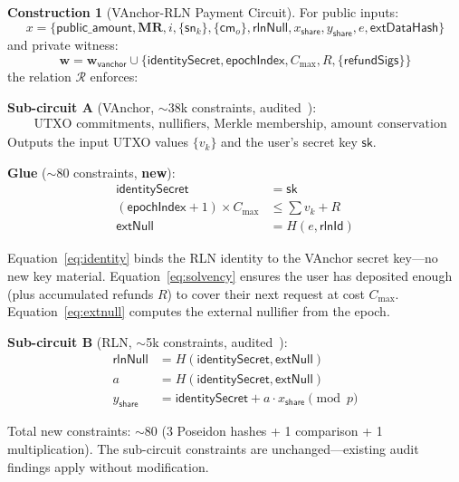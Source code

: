 \documentclass[11pt,a4paper]{article}
\theoremstyle{definition}
\newtheorem{construction}{Construction}
\begin{document}
\begin{construction}[VAnchor-RLN Payment Circuit]\label{con:composed}
For public inputs:
$$x = \{\mathsf{public\_amount}, \mathbf{MR}, i, \{\mathsf{sn}_k\}, \{\mathsf{cm}_o\}, \mathsf{rlnNull}, x_{\mathsf{share}}, y_{\mathsf{share}}, e, \mathsf{extDataHash}\}$$
and private witness:
$$\mathbf{w} = \mathbf{w}_{\mathsf{vanchor}} \cup \{\mathsf{identitySecret}, \mathsf{epochIndex}, C_{\max}, R, \{\mathsf{refundSigs}\}\}$$
the relation $\mathcal{R}$ enforces:

\medskip\noindent\textbf{Sub-circuit A} (VAnchor, $\sim$38k constraints, audited~\cite{veridise}):
\begin{align}
  &\text{UTXO commitments, nullifiers, Merkle membership, amount conservation}
\end{align}
Outputs the input UTXO values $\{v_k\}$ and the user's secret key $\mathsf{sk}$.

\medskip\noindent\textbf{Glue} ($\sim$80 constraints, \textbf{new}):
\begin{align}
  \mathsf{identitySecret} &= \mathsf{sk} \label{eq:identity}\\
  (\mathsf{epochIndex} + 1) \times C_{\max} &\leq \sum v_k + R \label{eq:solvency}\\
  \mathsf{extNull} &= H(e, \mathsf{rlnId}) \label{eq:extnull}
\end{align}

Equation~\eqref{eq:identity} binds the RLN identity to the VAnchor secret key---no new key material. Equation~\eqref{eq:solvency} ensures the user has deposited enough (plus accumulated refunds $R$) to cover their next request at cost $C_{\max}$. Equation~\eqref{eq:extnull} computes the external nullifier from the epoch.

\medskip\noindent\textbf{Sub-circuit B} (RLN, $\sim$5k constraints, audited~\cite{rlnaudit}):
\begin{align}
  \mathsf{rlnNull} &= H(\mathsf{identitySecret}, \mathsf{extNull}) \\
  a &= H(\mathsf{identitySecret}, \mathsf{extNull}) \\
  y_{\mathsf{share}} &= \mathsf{identitySecret} + a \cdot x_{\mathsf{share}} \pmod{p}
\end{align}

\medskip\noindent
Total new constraints: $\sim$80 (3 Poseidon hashes + 1 comparison + 1 multiplication). The sub-circuit constraints are unchanged---existing audit findings apply without modification.
\end{construction}
\end{document}
